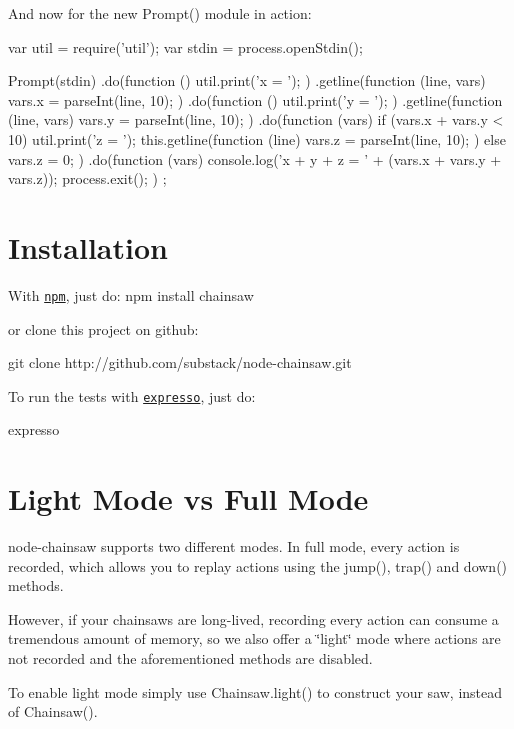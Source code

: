And now for the new Prompt() module in action\+: \begin{DoxyVerb}var util = require('util');
var stdin = process.openStdin();

Prompt(stdin)
    .do(function () {
        util.print('x = ');
    })
    .getline(function (line, vars) {
        vars.x = parseInt(line, 10);
    })
    .do(function () {
        util.print('y = ');
    })
    .getline(function (line, vars) {
        vars.y = parseInt(line, 10);
    })
    .do(function (vars) {
        if (vars.x + vars.y < 10) {
            util.print('z = ');
            this.getline(function (line) {
                vars.z = parseInt(line, 10);
            })
        }
        else {
            vars.z = 0;
        }
    })
    .do(function (vars) {
        console.log('x + y + z = ' + (vars.x + vars.y + vars.z));
        process.exit();
    })
;
\end{DoxyVerb}


\section*{Installation }

With \href{http://github.com/isaacs/npm}{\tt npm}, just do\+: npm install chainsaw

or clone this project on github\+: \begin{DoxyVerb}git clone http://github.com/substack/node-chainsaw.git
\end{DoxyVerb}


To run the tests with \href{http://github.com/visionmedia/expresso}{\tt expresso}, just do\+: \begin{DoxyVerb}expresso
\end{DoxyVerb}


\section*{Light Mode vs Full Mode }

{\ttfamily node-\/chainsaw} supports two different modes. In full mode, every action is recorded, which allows you to replay actions using the {\ttfamily jump()}, {\ttfamily trap()} and {\ttfamily down()} methods.

However, if your chainsaws are long-\/lived, recording every action can consume a tremendous amount of memory, so we also offer a \char`\"{}light\char`\"{} mode where actions are not recorded and the aforementioned methods are disabled.

To enable light mode simply use {\ttfamily Chainsaw.\+light()} to construct your saw, instead of {\ttfamily Chainsaw()}. 